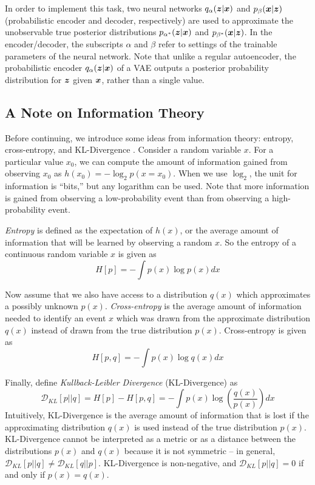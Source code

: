 In order to implement this task, two neural networks $q_\alpha(\boldsymbol{z} | \boldsymbol{x})$ and $p_\beta(\boldsymbol{x} | \boldsymbol{z})$ (probabilistic encoder and decoder, respectively) are used to approximate the unobservable true posterior distributions $p_{\alpha^*}(\boldsymbol{z}| \boldsymbol{x})$ and $p_{\beta^*}(\boldsymbol{x} | \boldsymbol{z})$. In the encoder/decoder, the subscripts $\alpha$ and $\beta$ refer to settings of the trainable parameters of the neural network. Note that unlike a regular autoencoder, the probabilistic encoder $q_\alpha(\boldsymbol{z} | \boldsymbol{x})$ of a VAE outputs a posterior probability distribution for $\boldsymbol{z}$ given $\boldsymbol{x}$, rather than a single value.

\subsection{A Note on Information Theory}
Before continuing, we introduce some ideas from information theory: entropy, cross-entropy, and KL-Divergence \cite{pattern_rec_book}. Consider a random variable $x$. For a particular value $x_0$, we can compute the amount of information gained from observing $x_0$ as $h(x_0) = -\log_2 p(x=x_0)$. When we use $\log_2$, the unit for information is ``bits,'' but any logarithm can be used. Note that more information is gained from observing a low-probability event than from observing a high-probability event. 

\textit{Entropy} is defined as the expectation of $h(x)$, or the average amount of information that will be learned by observing a random $x$. So the entropy of a continuous random variable $x$ is given as 
\begin{equation}
  H[p] = - \int p(x) \log p(x)dx
  \label{eq:entropy}
\end{equation}

Now assume that we also have access to a distribution $q(x)$ which approximates a possibly unknown $p(x)$. \textit{Cross-entropy} is the average amount of information needed to identify an event $x$ which was drawn from the approximate distribution $q(x)$ instead of drawn from the true distribution $p(x)$. Cross-entropy is given as
\begin{equation}
  H[p,q] = - \int p(x) \log q(x) dx
  \label{eq:xentropy}
\end{equation}

Finally, define \textit{Kullback-Leibler Divergence} (KL-Divergence) \cite{kullback1951} as 
\begin{equation}
  \mathcal{D}_{KL}\left[ p || q \right] = H[p] - H[p,q] = - \int p(x) \log \left(\frac{q(x)}{p(x)} \right)dx
  \label{eq:kl_div}
\end{equation}
Intuitively, KL-Divergence is the average amount of information that is lost if the approximating distribution $q(x)$ is used instead of the true distribution $p(x)$. KL-Divergence cannot be interpreted as a metric or as a distance between the distributions $p(x)$ and $q(x)$ because it is not symmetric -- in general, $\mathcal{D}_{KL}[p||q] \not = \mathcal{D}_{KL}[q||p]$. KL-Divergence is non-negative, and $\mathcal{D}_{KL}[p||q] = 0$ if and only if $p(x) = q(x)$.

